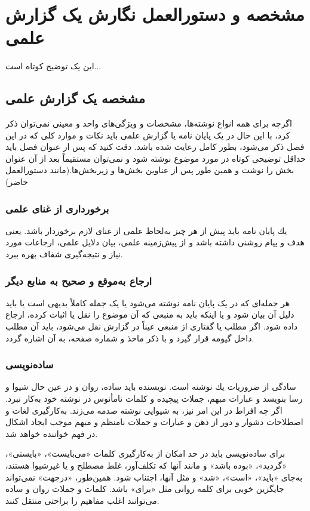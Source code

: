 \chapter{مشخصه و دستورالعمل نگارش یک گزارش علمی}\label{Chap:thesis}
\thispagestyle{empty}
این یک توضیح کوتاه است...
\section{مشخصه یک گزارش علمی}
اگرچه برای همه انواع نوشته‌ها، مشخصات و ویژگی‌های واحد و معینی نمی‌توان ذكر كرد، با این حال در یک پایان نامه یا گزارش علمی باید نکات و موارد کلی که در این فصل ذکر می‌شود، بطور کامل رعایت شده باشد. 
دقت كنید كه پس از عنوان فصل باید حداقل توضیحی کوتاه در مورد موضوع نوشته شود و نمی‌توان مستقیماً بعد از آن عنوان بخش را نوشت و همین طور پس از عناوین بخش‌ها و زیربخش‌ها.(مانند دستورالعمل حاضر)
\subsection{برخورداری از غنای علمی }
یك پایان نامه باید پیش از هر چیز به‌لحاظ علمی از غنای لازم برخوردار باشد. یعنی هدف و پیام روشنی داشته باشد و از پیش‌زمینه علمی، بیان دلایل علمی، ارجاعات مورد نیاز و نتیجه‌گیری شفاف بهره ببرد. 
\subsection{ارجاع به‌موقع و صحیح به منابع دیگر}
هر جمله‌ای که در یک پایان نامه نوشته می‌شود یا یک جمله کاملاً بدیهی است یا باید دلیل آن بیان شود و یا اینکه باید به منبعی که آن موضوع را نقل یا اثبات کرده، ارجاع داده شود. اگر مطلب یا گفتاری از منبعی عیناً در گزارش نقل می‌شود، باید آن مطلب داخل گیومه قرار گیرد و با ذكر ماخذ و شماره صفحه، به آن اشاره گردد.
\subsection{ساده‌نویسی}
سادگی از ضروریات یك نوشته است. نویسنده باید ساده، روان و در عین حال شیوا و رسا بنویسد و عبارات مبهم، جملات پیچیده و كلمات نامأنوس در نوشته خود به‌كار نبرد. اگر چه افراط در این امر نیز، به شیوایی نوشته صدمه می‌زند. به‌كارگیری لغات و اصطلاحات دشوار و دور از ذهن و عبارات و جملات نامنظم و مبهم موجب ایجاد اشكال در فهم خواننده خواهد شد‌. 

برای ساده‌نویسی باید در حد امكان از به‌كارگیری كلمات «می‌بایست»، «بایستی»، «گردید»، «بوده باشد» و مانند آنها كه تكلف‌آور، غلط مصطلح و یا غیرشیوا هستند، به‌جای «باید»، «است»، «شد» و مثل آنها، اجتناب شود‌.‌ همین‌طور، «در‌جهت» نمی‌تواند جایگزین خوبی برای كلمه روانی مثل «برای» باشد‌. ‌كلمات و جملات روان و ساده می‌توانند اغلب مفاهیم را براحتی منتقل كنند‌.‌     
 
